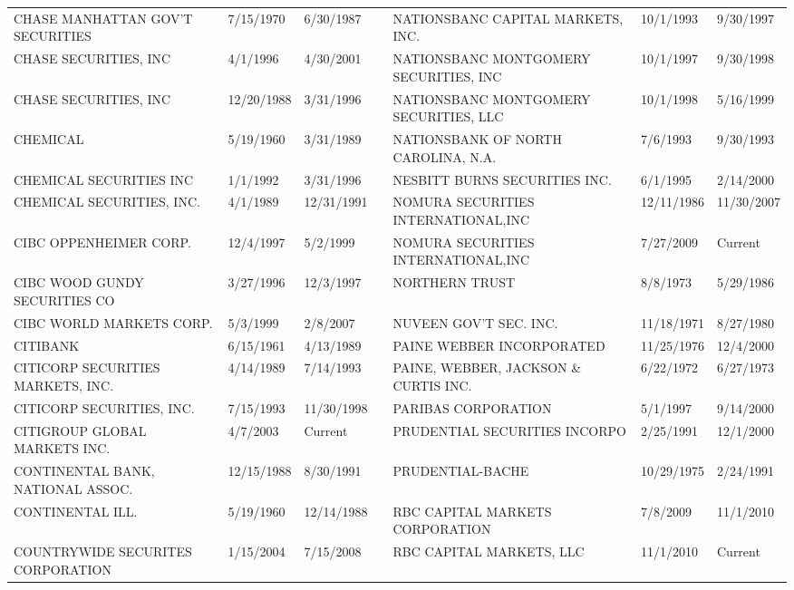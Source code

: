 \documentclass{article}
\begin{document}
\begin{adjustbox}{max width=\textwidth}
\begin{tabular}{lllllll}
CHASE MANHATTAN GOV'T SECURITIES     & 7/15/1970 & 6/30/1987 &  & NATIONSBANC CAPITAL MARKETS, INC.   & 10/1/1993 & 9/30/1997 \\
CHASE SECURITIES, INC               & 4/1/1996 & 4/30/2001 &  & NATIONSBANC MONTGOMERY SECURITIES, INC & 10/1/1997 & 9/30/1998 \\
CHASE SECURITIES, INC                & 12/20/1988 & 3/31/1996 &  & NATIONSBANC MONTGOMERY SECURITIES, LLC & 10/1/1998 & 5/16/1999 \\
CHEMICAL                            & 5/19/1960 & 3/31/1989 &  & NATIONSBANK OF NORTH CAROLINA, N.A. & 7/6/1993 & 9/30/1993 \\
CHEMICAL SECURITIES INC             & 1/1/1992 & 3/31/1996 &  & NESBITT BURNS SECURITIES INC.       & 6/1/1995 & 2/14/2000 \\
CHEMICAL SECURITIES, INC.           & 4/1/1989 & 12/31/1991 &  & NOMURA SECURITIES INTERNATIONAL,INC & 12/11/1986 & 11/30/2007 \\
CIBC OPPENHEIMER CORP.              & 12/4/1997 & 5/2/1999 &  & NOMURA SECURITIES INTERNATIONAL,INC & 7/27/2009 & Current \\
CIBC WOOD GUNDY SECURITIES CO       & 3/27/1996 & 12/3/1997 &  & NORTHERN TRUST                       & 8/8/1973 & 5/29/1986 \\
CIBC WORLD MARKETS CORP.            & 5/3/1999 & 2/8/2007 &  & NUVEEN GOV'T SEC. INC.               & 11/18/1971 & 8/27/1980 \\
CITIBANK                             & 6/15/1961 & 4/13/1989 &  & PAINE WEBBER INCORPORATED            & 11/25/1976 & 12/4/2000 \\
CITICORP SECURITIES MARKETS, INC.    & 4/14/1989 & 7/14/1993 &  & PAINE, WEBBER, JACKSON \& CURTIS INC. & 6/22/1972 & 6/27/1973 \\
CITICORP SECURITIES, INC.            & 7/15/1993 & 11/30/1998 &  & PARIBAS CORPORATION                  & 5/1/1997 & 9/14/2000 \\
CITIGROUP GLOBAL MARKETS INC.   & 4/7/2003 & Current &  & PRUDENTIAL SECURITIES INCORPO   & 2/25/1991 & 12/1/2000 \\
CONTINENTAL BANK, NATIONAL ASSOC.    & 12/15/1988 & 8/30/1991 &  & PRUDENTIAL-BACHE                & 10/29/1975 & 2/24/1991 \\
CONTINENTAL ILL.                     & 5/19/1960 & 12/14/1988 &  & RBC CAPITAL MARKETS CORPORATION & 7/8/2009 & 11/1/2010 \\
COUNTRYWIDE SECURITES CORPORATION & 1/15/2004 & 7/15/2008 &  & RBC CAPITAL MARKETS, LLC & 11/1/2010 & Current \\

\end{tabular}
\end{adjustbox}
\end{document}

